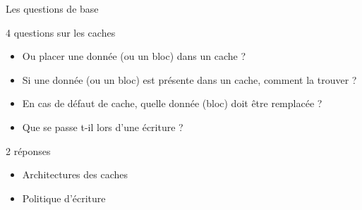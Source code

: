 %
\begin{Frame}{Les questions de base}


      \begin{block}{4 questions sur les caches}{}
        \begin{itemize}
        \item Ou placer une donnée (ou un bloc) dans un cache ?
	\item Si une donnée (ou un bloc) est présente dans un cache, comment la trouver ?
	\item En cas de défaut de cache, quelle donnée (bloc) doit être remplacée ?
	\item Que se passe t-il lors d'une écriture ?
        \end{itemize}
      \end{block} 

      \begin{alertblock}{2 réponses}{}
        \begin{itemize}
        \item Architectures des caches
	\item Politique d'écriture
        \end{itemize}
      \end{alertblock} 

      
\end{Frame}


